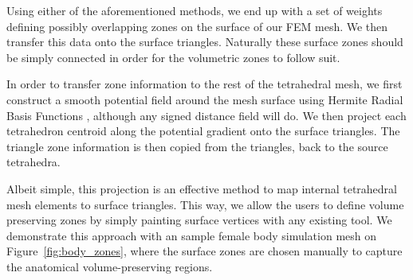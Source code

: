 Using either of the aforementioned methods, we end up with a set of weights defining possibly
overlapping zones on the surface of our FEM mesh. We then transfer this data onto the surface
triangles. Naturally these surface zones should be simply connected in order for the volumetric
zones to follow suit.

In order to transfer zone information to the rest of the tetrahedral mesh, we first construct a
smooth potential field around the mesh surface using Hermite Radial Basis Functions
\cite{Pai:2018, Vaillant:2013, Macedo:2009, Wendland:2004}, although any signed distance field will
do.  We then project each tetrahedron centroid along the potential gradient onto the surface
triangles. The triangle zone information is then copied from the triangles, back to the
source tetrahedra.

Albeit simple, this projection is an effective method to map internal tetrahedral mesh elements to
surface triangles. This way, we allow the users to define volume preserving zones by simply
painting surface vertices with any existing tool. We demonstrate
this approach with an sample female body simulation mesh on Figure~\ref{fig:body_zones}, where the
surface zones are chosen manually to capture the anatomical volume-preserving regions. 